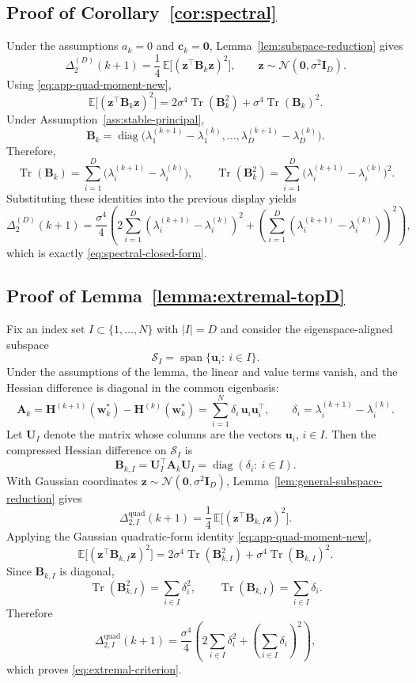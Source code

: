 \documentclass[10pt]{article}
\theoremstyle{plain}
\theoremstyle{remark}
\begin{document}
\subsection{Proof of Corollary~\ref{cor:spectral}}

Under the assumptions $a_k=0$ and $\mathbf c_k=\mathbf 0$, Lemma~\ref{lem:subspace-reduction} gives
\[
\Delta_2^{(D)}(k+1)
=
\frac14\,
\mathbb E\bigl[(\mathbf z^\top\mathbf B_k\mathbf z)^2\bigr],
\qquad
\mathbf z\sim\mathcal N(\mathbf 0,\sigma^2\mathbf I_D).
\]
Using \eqref{eq:app-quad-moment-new},
\[
\mathbb E\bigl[(\mathbf z^\top\mathbf B_k\mathbf z)^2\bigr]
=
2\sigma^4\operatorname{Tr}(\mathbf B_k^2)
+
\sigma^4\operatorname{Tr}(\mathbf B_k)^2.
\]
Under Assumption~\ref{ass:stable-principal},
\[
\mathbf B_k
=
\operatorname{diag}\bigl(
\lambda_1^{(k+1)}-\lambda_1^{(k)},
\dots,
\lambda_D^{(k+1)}-\lambda_D^{(k)}
\bigr).
\]
Therefore,
\[
\operatorname{Tr}(\mathbf B_k)
=
\sum_{i=1}^D \bigl(\lambda_i^{(k+1)}-\lambda_i^{(k)}\bigr),
\qquad
\operatorname{Tr}(\mathbf B_k^2)
=
\sum_{i=1}^D \bigl(\lambda_i^{(k+1)}-\lambda_i^{(k)}\bigr)^2.
\]
Substituting these identities into the previous display yields
\[
\Delta_2^{(D)}(k+1)
=
\frac{\sigma^4}{4}
\left(
2\sum_{i=1}^D (\lambda_i^{(k+1)}-\lambda_i^{(k)})^2
+
\left(
\sum_{i=1}^D (\lambda_i^{(k+1)}-\lambda_i^{(k)})
\right)^2
\right),
\]
which is exactly \eqref{eq:spectral-closed-form}.

\subsection{Proof of Lemma~\ref{lemma:extremal-topD}}

Fix an index set $I\subset\{1,\dots,N\}$ with $|I|=D$ and consider the eigenspace-aligned subspace
\[
\mathcal S_I=\operatorname{span}\{\mathbf u_i:\ i\in I\}.
\]
Under the assumptions of the lemma, the linear and value terms vanish, and the Hessian difference is diagonal in the common eigenbasis:
\[
\mathbf A_k
=
\mathbf H^{(k+1)}(\mathbf w_k^*)-\mathbf H^{(k)}(\mathbf w_k^*)
=
\sum_{i=1}^N \delta_i\, \mathbf u_i\mathbf u_i^\top,
\qquad
\delta_i=\lambda_i^{(k+1)}-\lambda_i^{(k)}.
\]
Let $\mathbf U_I$ denote the matrix whose columns are the vectors $\mathbf u_i$, $i\in I$.
Then the compressed Hessian difference on $\mathcal S_I$ is
\[
\mathbf B_{k,I}
=
\mathbf U_I^\top \mathbf A_k \mathbf U_I
=
\operatorname{diag}(\delta_i:\ i\in I).
\]
With Gaussian coordinates $\mathbf z\sim\mathcal N(\mathbf 0,\sigma^2\mathbf I_D)$, Lemma~\ref{lem:general-subspace-reduction} gives
\[
\Delta_{2,I}^{\mathrm{quad}}(k+1)
=
\frac14\,\mathbb E\bigl[(\mathbf z^\top \mathbf B_{k,I}\mathbf z)^2\bigr].
\]
Applying the Gaussian quadratic-form identity \eqref{eq:app-quad-moment-new},
\[
\mathbb E\bigl[(\mathbf z^\top \mathbf B_{k,I}\mathbf z)^2\bigr]
=
2\sigma^4 \operatorname{Tr}(\mathbf B_{k,I}^2)
+
\sigma^4 \operatorname{Tr}(\mathbf B_{k,I})^2.
\]
Since $\mathbf B_{k,I}$ is diagonal,
\[
\operatorname{Tr}(\mathbf B_{k,I}^2)=\sum_{i\in I}\delta_i^2,
\qquad
\operatorname{Tr}(\mathbf B_{k,I})=\sum_{i\in I}\delta_i.
\]
Therefore
\[
\Delta_{2,I}^{\mathrm{quad}}(k+1)
=
\frac{\sigma^4}{4}
\left(
2\sum_{i\in I}\delta_i^2
+
\left(\sum_{i\in I}\delta_i\right)^2
\right),
\]
which proves \eqref{eq:extremal-criterion}.
\end{document}
